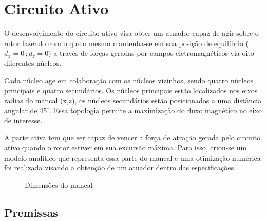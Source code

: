 \pagestyle{empty}
\cleardoublepage
\pagestyle{fancy}

%




\chapter{Circuito Ativo}
%

O desenvolvimento do circuito ativo visa obter um atuador capaz de agir sobre o rotor fazendo com o que o mesmo mantenha-se em sua posição de equilíbrio ($d_x = 0 \, ; d_z = 0$) a través de forças geradas por campos eletromagnéticos via oito diferentes núcleos.

Cada núcleo age em colaboração com os núcleos vizinhos, sendo quatro núcleos principais e quatro secundários. Os núcleos principais estão localizados nos eixos radias do mancal (x,z), os núcleos secundários estão posicionados a uma distância angular de $45 ^\circ$. Essa topologia permite a maximização do fluxo magnético no eixo de interesse.

A parte ativa tem que ser capaz de vencer a força de atração gerada pelo circuito ativo quando o rotor estiver em sua excursão máxima. Para isso, criou-se um modelo analítico que representa essa parte do mancal e uma otimização numérica foi realizada visando a obtenção de um atuador dentro das especificações.

\begin{figure}[!ht]
	\centering
	\def\svgwidth{1\columnwidth}
	
	\caption{Dimensões do mancal}
	\label{Fig:modelagem:dim:ativo}
\end{figure}

\section{Premissas}

